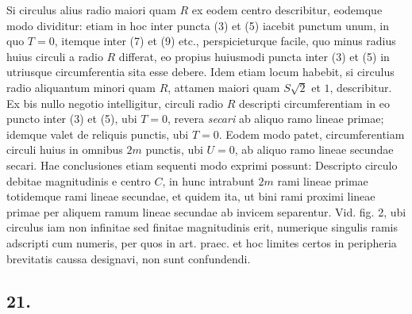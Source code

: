 \documentclass[twoside,12pt, showframe]{memoir}
\begin{document}
 Si circulus alius radio maiori quam \(R\) ex eodem centro describitur, eodemque modo dividitur: etiam in hoc inter puncta (3) et (5) iacebit punctum unum, in quo \(T= 0\), itemque inter (7) et (9) etc{.}, perspicieturque facile, quo minus radius huius circuli a radio \(R\) differat, eo propius huiusmodi puncta inter (3) et (5) in utriusque circumferentia sita esse debere. Idem etiam locum habebit, si circulus radio aliquantum minori quam \(R\), attamen maiori quam \(S\surd{2}\) et \(1\), describitur.  Ex bis nullo negotio intelligitur, circuli radio \(R\) descripti circumferentiam in eo puncto inter (3) et (5), ubi \(T=0\), revera \textit{secari} ab aliquo ramo lineae primae; idemque valet de reliquis punctis, ubi \(T= 0\). Eodem modo patet, circumferentiam circuli huius in omnibus \(2m\) punctis, ubi \(U=0\), ab aliquo ramo lineae secundae secari. Hae conclusiones etiam sequenti modo exprimi possunt: Descripto circulo debitae magnitudinis e centro \(C\), in hunc intrabunt \(2m\) rami lineae primae totidemque rami lineae secundae, et quidem ita, ut bini rami proximi lineae primae per aliquem ramum lineae secundae ab invicem separentur.  Vid. fig. 2, ubi circulus iam non infinitae sed finitae magnitudinis erit, numerique singulis ramis adscripti cum numeris, per quos in art. praec. et hoc limites certos in peripheria brevitatis caussa designavi, non sunt confundendi.

\subsection*{21.}
\end{document}
